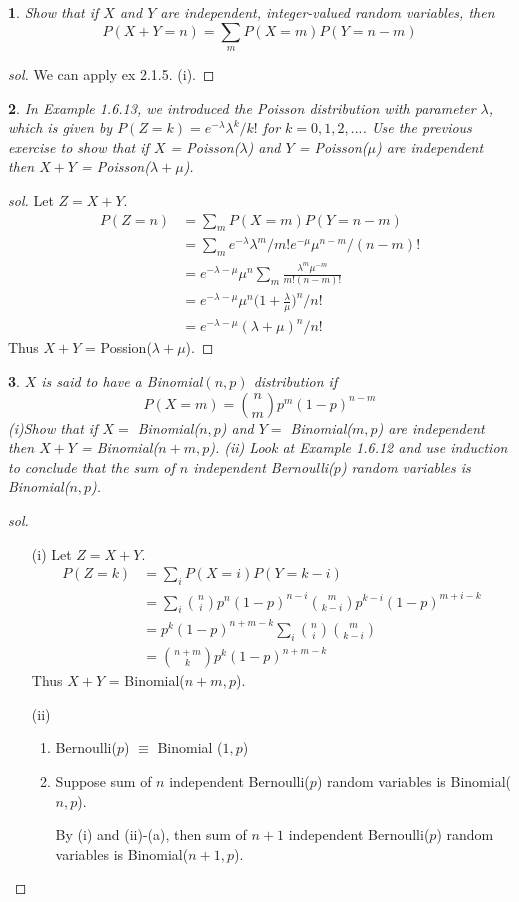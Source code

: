 \documentclass{report}
\newtheorem{ex}{}[section]
\begin{document}
\begin{ex}
Show that if $X$ and $Y$ are independent, integer-valued random variables, then
\[P(X + Y = n) = \sum_m P(X = m)P(Y = n-m)\]
\end{ex}
\begin{proof}[sol]
We can apply ex 2.1.5. (i).
\end{proof}
\begin{ex}
In Example 1.6.13, we introduced the Poisson distribution with parameter $\lambda$, which is given by $P(Z = k) = e^{-\lambda}\lambda^k / k!$ for $k = 0,1,2,...$. Use the previous exercise to show that if $X$ = Poisson($\lambda$) and $Y$ = Poisson($\mu$) are independent then $X + Y$ = Poisson($\lambda + \mu$).
\end{ex}
\begin{proof}[sol]
Let $Z = X+Y$.
\begin{align*}
    P(Z = n) &= \sum_m P(X = m)P(Y = n-m)\\
    &=\sum_m e^{-\lambda}\lambda^m / m! e^{-\mu}\mu^{n-m}/(n-m)!\\
    &=e^{-\lambda-\mu}\mu^n \sum_m \frac{\lambda^m \mu^{-m}}{m!(n-m)!}\\
    &=e^{-\lambda-\mu}\mu^n\bigg(1 + \frac{\lambda}{\mu}\bigg)^n/n!\\
    &=e^{-\lambda-\mu}(\lambda + \mu)^n/n!
\end{align*}
Thus $X + Y$ = Possion($\lambda + \mu$).
\end{proof}
\begin{ex}
$X$ is said to have a Binomial$(n,p)$ distribution if
\[P(X = m) = \binom{n}{m}p^m(1-p)^{n-m}\]
(i)Show that if $X = $ Binomial($n,p$) and $Y = $ Binomial($m,p$) are independent then $X+Y$ = Binomial($n+m,p$). (ii) Look at Example 1.6.12 and use induction to conclude that the sum of $n$ independent Bernoulli($p$) random variables is Binomial($n,p$).
\end{ex}
\begin{proof}[sol]~
\begin{enumerate}
    \item[(i)] 
    Let $Z = X+Y$.
\begin{align*}
    P(Z = k) &= \sum_i P(X = i)P(Y = k-i)\\
    &=\sum_i \binom{n}{i}p^n(1-p)^{n-i}\binom{m}{k-i}p^{k-i}(1-p)^{m+i-k}\\
    &=p^k(1-p)^{n+m-k}\sum_i\binom{n}{i}\binom{m}{k-i}\\
    &=\binom{n+m}{k}p^k(1-p)^{n+m-k}
\end{align*}
Thus $X + Y$ = Binomial($n+m, p$).
    \item[(ii)]
    \begin{enumerate}
        \item Bernoulli($p$) $\equiv$ Binomial ($1, p$)
        \item Suppose sum of $n$ independent Bernoulli($p$) random variables is Binomial($n,p$).
        
        By (i) and (ii)-(a), then sum of $n+1$ independent Bernoulli($p$) random variables is Binomial($n+1, p$).
    \end{enumerate}
\end{enumerate}
\end{proof}
\end{document}
